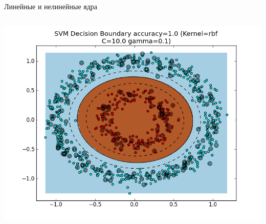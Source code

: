 \documentclass[notheorems, handout]{beamer}
\begin{document}
\begin{frame}{Линейные и нелинейные ядра}
\begin{columns}
\begin{column}{0.5\textwidth}
      \includegraphics[width=\textwidth]{img/rbf_kernel}
    \end{column}
  \end{columns}
\end{frame}
\end{document}
